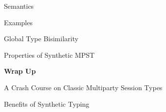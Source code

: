 \begin{frame}{Semantics}
\end{frame}

\begin{frame}{Examples}
\end{frame}

\begin{frame}{Global Type Bisimilarity}
\end{frame}

\begin{frame}{Properties of Synthetic MPST}
\end{frame}

\begin{frame}
  \vfill
  \centering
  \begin{sticky}
    {\normalfont \textbf{Wrap Up}}

    {\normalfont\Large A Crash Course on Classic Multiparty Session Types}
    \par%
  \end{sticky}
  \vfill
\end{frame}

\begin{frame}{Benefits of Synthetic Typing}
\end{frame}

